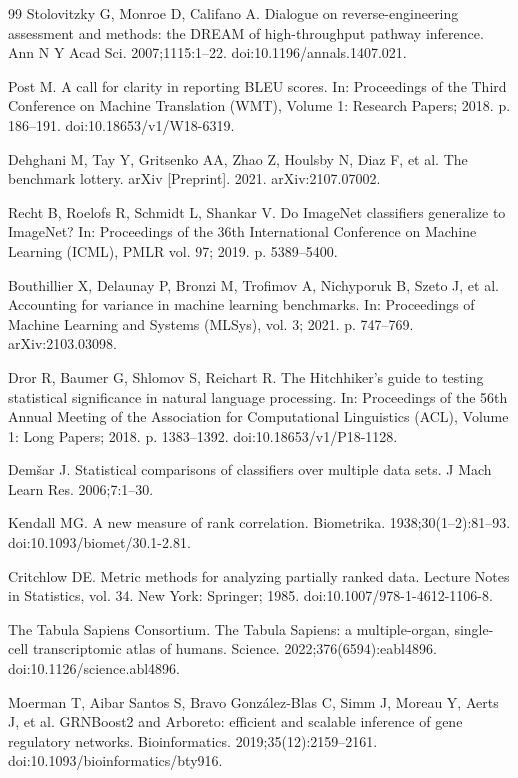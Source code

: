 \documentclass[10pt,letterpaper]{article}
\begin{document}
\begin{thebibliography}{99}
Stolovitzky G, Monroe D, Califano A. Dialogue on reverse-engineering assessment and methods: the DREAM of high-throughput pathway inference. Ann N Y Acad Sci. 2007;1115:1--22. doi:10.1196/annals.1407.021.

Post M. A call for clarity in reporting BLEU scores. In: Proceedings of the Third Conference on Machine Translation (WMT), Volume 1: Research Papers; 2018. p. 186--191. doi:10.18653/v1/W18-6319.

Dehghani M, Tay Y, Gritsenko AA, Zhao Z, Houlsby N, Diaz F, et al. The benchmark lottery. arXiv [Preprint]. 2021. arXiv:2107.07002.

Recht B, Roelofs R, Schmidt L, Shankar V. Do ImageNet classifiers generalize to ImageNet? In: Proceedings of the 36th International Conference on Machine Learning (ICML), PMLR vol. 97; 2019. p. 5389--5400.

Bouthillier X, Delaunay P, Bronzi M, Trofimov A, Nichyporuk B, Szeto J, et al. Accounting for variance in machine learning benchmarks. In: Proceedings of Machine Learning and Systems (MLSys), vol. 3; 2021. p. 747--769. arXiv:2103.03098.

Dror R, Baumer G, Shlomov S, Reichart R. The Hitchhiker's guide to testing statistical significance in natural language processing. In: Proceedings of the 56th Annual Meeting of the Association for Computational Linguistics (ACL), Volume 1: Long Papers; 2018. p. 1383--1392. doi:10.18653/v1/P18-1128.

Dem\v{s}ar J. Statistical comparisons of classifiers over multiple data sets. J Mach Learn Res. 2006;7:1--30.

Kendall MG. A new measure of rank correlation. Biometrika. 1938;30(1--2):81--93. doi:10.1093/biomet/30.1-2.81.

Critchlow DE. Metric methods for analyzing partially ranked data. Lecture Notes in Statistics, vol. 34. New York: Springer; 1985. doi:10.1007/978-1-4612-1106-8.

The Tabula Sapiens Consortium. The Tabula Sapiens: a multiple-organ, single-cell transcriptomic atlas of humans. Science. 2022;376(6594):eabl4896. doi:10.1126/science.abl4896.

Moerman T, Aibar Santos S, Bravo Gonz\'alez-Blas C, Simm J, Moreau Y, Aerts J, et al. GRNBoost2 and Arboreto: efficient and scalable inference of gene regulatory networks. Bioinformatics. 2019;35(12):2159--2161. doi:10.1093/bioinformatics/bty916.


\end{thebibliography}
\end{document}
